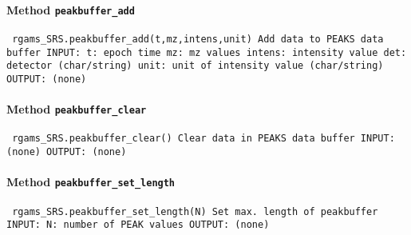 \paragraph{Method \texttt{peakbuffer_add}}
\vspace{1ex}
\texttt{\newline
rgams_SRS.peakbuffer_add(t,mz,intens,unit)\newline
\newline
Add data to PEAKS data buffer\newline
\newline
INPUT:\newline
t: epoch time\newline
mz: mz values\newline
intens: intensity value\newline
det: detector (char/string)\newline
unit: unit of intensity value (char/string)\newline
\newline
OUTPUT:\newline
(none)\newline
\newline
}

\paragraph{Method \texttt{peakbuffer_clear}}
\vspace{1ex}
\texttt{\newline
rgams_SRS.peakbuffer_clear()\newline
\newline
Clear data in PEAKS data buffer\newline
\newline
INPUT:\newline
(none)\newline
\newline
OUTPUT:\newline
(none)\newline
\newline
}

\paragraph{Method \texttt{peakbuffer_set_length}}
\vspace{1ex}
\texttt{\newline
rgams_SRS.peakbuffer_set_length(N)\newline
\newline
Set max. length of peakbuffer\newline
\newline
INPUT:\newline
N: number of PEAK values\newline
\newline
OUTPUT:\newline
(none)\newline
\newline
}

